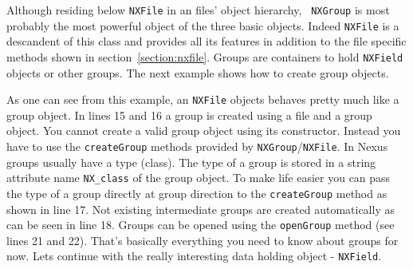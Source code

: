 
Although residing below {\tt NXFile} in an files' object hierarchy, {\tt
NXGroup} is most probably the most powerful object of the three basic 
objects. 
Indeed {\tt NXFile} is a descandent of this class and provides all its
features in addition to the file specific methods shown in
section~\ref{section:nxfile}. Groups are containers to hold {\tt NXField}
objects or other groups. The next example shows how to create group objects.

As one can see from this example, an {\tt NXFile} objects behaves pretty 
much like a group object. In lines 15 and 16 a group is created 
using a file and a group object. You cannot create a valid group object
using its constructor. Instead you have to use the {\tt createGroup} methods
provided by {\tt NXGroup}/{\tt NXFile}.
In Nexus groups usually have a type (class). The type of a group is 
stored in a string attribute name {\tt NX\_class} of the group object. 
To make life easier you can pass the type of a group directly at 
group direction to the {\tt createGroup} method as shown in line 17. 
Not existing intermediate groups are created automatically as can be 
seen in line 18.
Groups can be opened using the {\tt openGroup} method (see lines 21 and 22).
That's basically everything you need to know about groups for now.
Lets continue with the really interesting data holding object - {\tt NXField}. 



